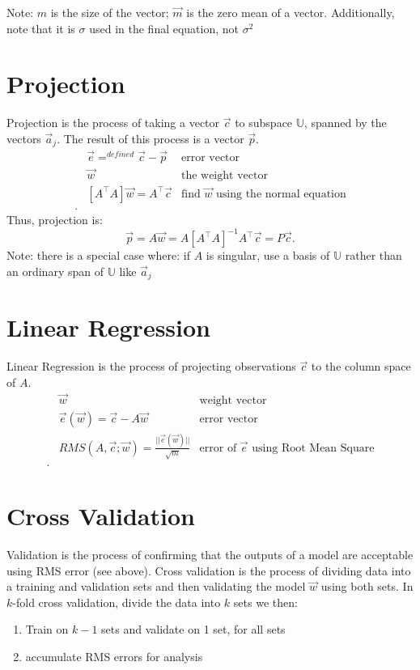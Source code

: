 \documentclass[12pt]{book}
\begin{document}
Note: $m$ is the size of the vector;  $\vec m$ is the zero mean of a vector. Additionally, note that
it is  $\sigma$ used in the final equation, not  $\sigma^2$
\pagebreak

\section*{Projection}
Projection is the process of taking a vector  $\vec c$ to subspace  $\mathbb{U}$, spanned by the vectors  $\vec a_j$.
The result of this process is a vector  $\vec p$.
\begin{align*}
        &\vec e =^{defined} \vec c - \vec p &\text{error vector} \\
        &\vec w &\text{the weight vector}\\
        &[A^\top A]\vec w = A^\top \vec c &\text{find $\vec w$ using the normal equation}\\
.\end{align*}
Thus, projection is:
\[
\vec p = A\vec w = A[A^\top A]^{-1} A^\top \vec c = P\vec c
.\] 
Note: there is a special case where: if $A$ is singular, use a basis of  $\mathbb{U}$ rather than an ordinary span of $\mathbb{U}$ like $\vec a_j$


\section*{Linear Regression}
Linear Regression is the process of projecting observations $\vec c$ to the column space of  $A$.
 \begin{align*}
        &\vec w &\text{weight vector}\\
        &\vec e(\vec w) = \vec c - A\vec w &\text{error vector}\\
        &RMS(A,\vec c;\vec w) = \frac{||\vec e(\vec w)||}{\sqrt{m}} &\text{error of $\vec e$ using Root Mean Square}\\
.\end{align*}

\section*{Cross Validation}
Validation is the process of confirming that the outputs of a model are acceptable using RMS error (see above).
Cross validation is the process of dividing data into a training and validation sets and then validating the model $\vec w$ using both
sets.
In  $k$-fold cross validation, divide the data into  $k$ sets we then:
 \begin{enumerate}
        \item Train on $k-1$ sets and validate on 1 set, for all sets
        \item accumulate RMS errors for analysis
\end{enumerate}
\end{document}

